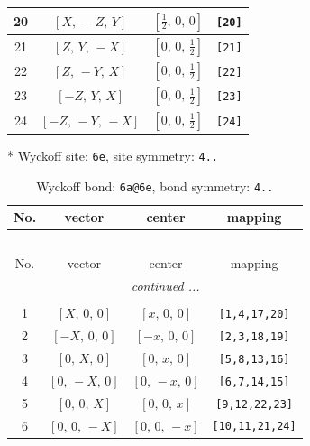 \documentclass[fleqn,8pt]{jsarticle}
\begin{document}
\begin{longtable}{cccc}
20 & $\left[ X,\, - Z,\, Y \right]$ & $\left[ \frac{1}{2},\, 0,\, 0 \right]$ & {\tt [20]} \\ \hline
21 & $\left[ Z,\, Y,\, - X \right]$ & $\left[ 0,\, 0,\, \frac{1}{2} \right]$ & {\tt [21]} \\ \hline
22 & $\left[ Z,\, - Y,\, X \right]$ & $\left[ 0,\, 0,\, \frac{1}{2} \right]$ & {\tt [22]} \\ \hline
23 & $\left[ - Z,\, Y,\, X \right]$ & $\left[ 0,\, 0,\, \frac{1}{2} \right]$ & {\tt [23]} \\ \hline
24 & $\left[ - Z,\, - Y,\, - X \right]$ & $\left[ 0,\, 0,\, \frac{1}{2} \right]$ & {\tt [24]} \\
\end{longtable}
* Wyckoff site: {\tt 6e}, site symmetry: {\tt 4..}
\renewcommand{\arraystretch}{1.2}
\begin{longtable}{cccc}
\caption{Wyckoff bond: {\tt 6a@6e}, bond symmetry: {\tt 4..}}
 \\
 \hline \hline
No. & vector & center & mapping \\ \hline \endfirsthead

\multicolumn{3}{l}{\tablename\ \thetable{}} \\
 \hline \hline
No. & vector & center & mapping \\ \hline \endhead

 \hline \hline
\multicolumn{3}{r}{\footnotesize\it continued ...} \\ \endfoot

 \hline \hline
\multicolumn{3}{r}{} \\ \endlastfoot

1 & $\left[ X,\, 0,\, 0 \right]$ & $\left[ x,\, 0,\, 0 \right]$ & {\tt [1,4,17,20]} \\ \hline
2 & $\left[ - X,\, 0,\, 0 \right]$ & $\left[ - x,\, 0,\, 0 \right]$ & {\tt [2,3,18,19]} \\ \hline
3 & $\left[ 0,\, X,\, 0 \right]$ & $\left[ 0,\, x,\, 0 \right]$ & {\tt [5,8,13,16]} \\ \hline
4 & $\left[ 0,\, - X,\, 0 \right]$ & $\left[ 0,\, - x,\, 0 \right]$ & {\tt [6,7,14,15]} \\ \hline
5 & $\left[ 0,\, 0,\, X \right]$ & $\left[ 0,\, 0,\, x \right]$ & {\tt [9,12,22,23]} \\ \hline
6 & $\left[ 0,\, 0,\, - X \right]$ & $\left[ 0,\, 0,\, - x \right]$ & {\tt [10,11,21,24]} \\
\end{longtable}
\renewcommand{\arraystretch}{1.2}
\end{document}
